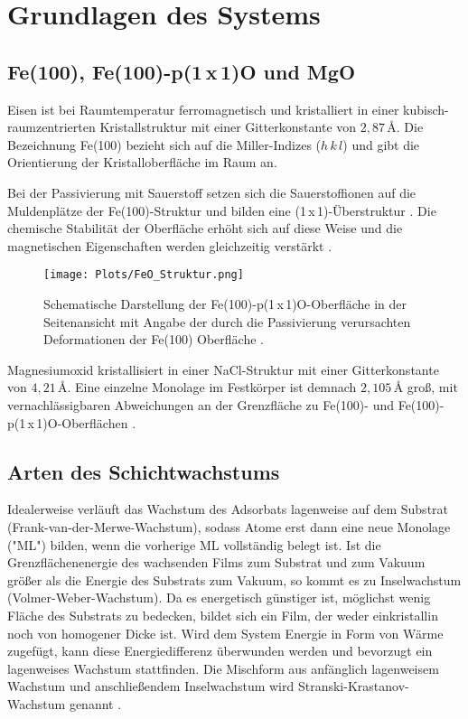 \chapter{Grundlagen des Systems}
\section{Fe(100), Fe(100)-p(1\,x\,1)O und MgO}

Eisen ist bei Raumtemperatur ferromagnetisch und kristalliert in einer kubisch-raumzentrierten Kristallstruktur 
mit einer Gitterkonstante von $2,87\,\si{\angstrom}$. 
Die Bezeichnung Fe(100) bezieht sich auf die Miller-Indizes ($h\,k\,l$) und gibt die Orientierung der Kristalloberfläche im Raum an.

Bei der Passivierung mit Sauerstoff setzen sich die Sauerstoffionen auf die Muldenplätze der Fe(100)-Struktur und bilden eine (1\,x\,1)-Überstruktur \cite{jona1987re}.
Die chemische Stabilität der Oberfläche erhöht sich auf diese Weise und die magnetischen Eigenschaften werden gleichzeitig verstärkt \cite{tange2010electronic}.

\begin{SCfigure}
    \centering
    \texttt{[image: Plots/FeO\_Struktur.png]}
    \caption{Schematische Darstellung der Fe(100)-p(1\,x\,1)O-Oberfläche in der Seitenansicht mit Angabe der durch die Passivierung verursachten Deformationen der Fe(100) Oberfläche \cite{jona1987re}.}
    \label{fig:FeO}
\end{SCfigure}

Magnesiumoxid kristallisiert in einer NaCl-Struktur mit einer Gitterkonstante von $4,21\,\si{\angstrom}$.
Eine einzelne Monolage im Festkörper ist demnach $2,105\,\si{\angstrom}$ groß, mit vernachlässigbaren Abweichungen
an der Grenzfläche zu Fe(100)- und Fe(100)-p(1\,x\,1)O-Oberflächen \cite{meyerheim2001geometrical}.




\section{Arten des Schichtwachstums}
\label{sec:Wachstum}

Idealerweise verläuft das Wachstum des Adsorbats lagenweise auf dem Substrat (Frank-van-der-Merwe-Wachstum), sodass Atome erst dann 
eine neue Monolage ("ML") bilden, wenn die vorherige ML vollständig belegt ist.
Ist die Grenzflächenenergie des wachsenden Films zum Substrat und zum Vakuum größer als 
die Energie des Substrats zum Vakuum, so kommt es zu Inselwachstum (Volmer-Weber-Wachstum).
Da es energetisch günstiger ist, möglichst wenig Fläche des Substrats zu bedecken, bildet sich ein Film, der weder einkristallin 
noch von homogener Dicke ist.
Wird dem System Energie in Form von Wärme zugefügt, kann diese Energiedifferenz überwunden werden und bevorzugt ein lagenweises Wachstum 
stattfinden. Die Mischform aus anfänglich lagenweisem Wachstum und anschließendem Inselwachstum wird Stranski-Krastanov-Wachstum genannt \cite{fauster}.

